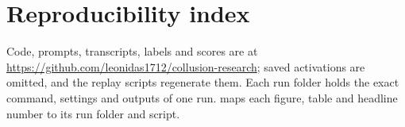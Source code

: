 \section{Reproducibility index}
\label{app:repro}

Code, prompts, transcripts, labels and scores are at \url{https://github.com/leonidas1712/collusion-research}; saved activations are omitted, and the replay scripts regenerate them.
Each run folder holds the exact command, settings and outputs of one run.
 maps each figure, table and headline number to its run folder and script.

\begin{table}[h]
  \centering
  \scriptsize
  
  \caption{Reproducibility index.}
  \label{tab:repro}
\end{table}
